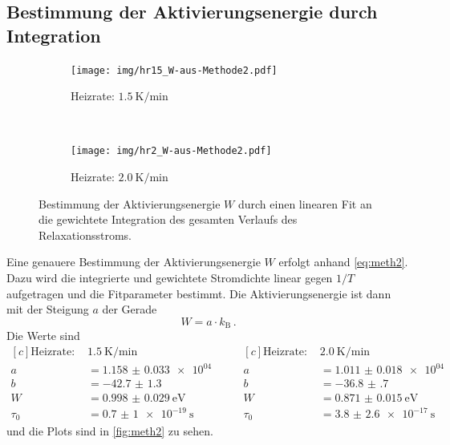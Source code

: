 \subsection{Bestimmung der Aktivierungsenergie durch Integration}
\label{sec:linin}

\begin{figure}[htp]
    \centering
    \begin{subfigure}[t]{0.5\textwidth}
        \centering
        \texttt{[image: img/hr15\_W-aus-Methode2.pdf]}
        \caption{Heizrate: $\SI{1.5}{\kelvin\per\minute}$}
    \end{subfigure}%
    ~
    \begin{subfigure}[t]{0.5\textwidth}
        \centering
        \texttt{[image: img/hr2\_W-aus-Methode2.pdf]}
        \caption{Heizrate: $\SI{2.0}{\kelvin\per\minute}$}
    \end{subfigure}
    \caption{Bestimmung der Aktivierungsenergie $W$ durch einen linearen Fit an die gewichtete Integration des gesamten Verlaufs des Relaxationsstroms.}
    \label{fig:meth2}
\end{figure}

Eine genauere Bestimmung der Aktivierungsenergie $W$ erfolgt anhand \autoref{eq:meth2}. Dazu wird die integrierte und gewichtete Stromdichte linear gegen $1/T$ aufgetragen und die Fitparameter bestimmt. Die Aktivierungsenergie ist dann mit der Steigung $a$ der Gerade
\begin{equation*}
    W = a \cdot k_\text{B}\,.
\end{equation*}
Die Werte sind
\begin{equation*}
\begin{aligned}[c]
  \text{Heizrate: }& \SI{1.5}{\kelvin\per\minute}\\
  a &= \num{1.158(33)e+04}\\
  b &= \num{-42.7(13)}\\
  W &= \SI{0.998(29)}{\electronvolt}\\
  \tau_0 &= \SI{0.7(10)e-19}{\second}
\end{aligned}
\qquad
\begin{aligned}[c]
  \text{Heizrate: }& \SI{2.0}{\kelvin\per\minute}\\
  a &= \num{1.011(18)e+04}\\
  b &= \num{-36.8(7)}\\
  W &= \SI{0.871(15)}{\electronvolt}\\
  \tau_0 &= \SI{3.8(26)e-17}{\second}
\end{aligned}
\end{equation*}
und die Plots sind in \autoref{fig:meth2} zu sehen.

